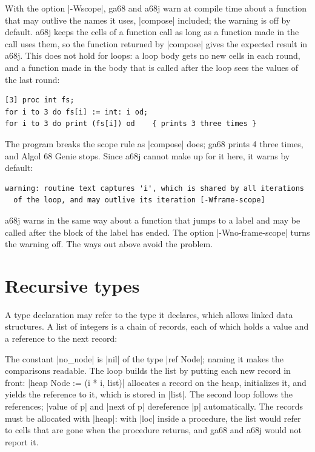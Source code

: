 \begin{implnote}
With the option \code|-Wscope|, ga68 and a68j warn at compile time about
a function that may outlive the names it uses, \code|compose| included;
the warning is off by default. a68j keeps the cells of a function call
as long as a function made in the call uses them, so the function
returned by \code|compose| gives the expected result in a68j. This does not hold for
loops: a loop body gets no new cells in each round, and a function made
in the body that is called after the loop sees the values of the last
round:
\begin{lstlisting}
[3] proc int fs;
for i to 3 do fs[i] := int: i od;
for i to 3 do print (fs[i]) od    { prints 3 three times }
\end{lstlisting}
The program breaks the scope rule as \code|compose| does; ga68 prints 4
three times, and Algol 68 Genie stops. Since a68j cannot make up for it
here, it warns by default:
\begin{lstlisting}[style=output]
warning: routine text captures 'i', which is shared by all iterations
  of the loop, and may outlive its iteration [-Wframe-scope]
\end{lstlisting}
\noindent a68j warns in the same way about a function that jumps to a
label and may be called after the block of the label has ended. The
option \code|-Wno-frame-scope| turns the warning off. The ways out above
avoid the problem.
\end{implnote}

\section{Recursive types}\label{sec-recursive}

A type declaration may refer to the type it declares, which allows
linked data structures. A list of integers is a chain of records, each of
which holds a value and a reference to the next record:


The constant \code|no_node| is \code|nil| of the type \code|ref Node|;
naming it makes the comparisons readable. The loop builds the list by
putting each new record in front: \code|heap Node := (i * i, list)|
allocates a record on the heap, initializes it, and yields the reference
to it, which is stored in \code|list|. The second loop follows the
references; \code|value of p| and \code|next of p| dereference \code|p|
automatically. The records must be allocated with \code|heap|: with
\code|loc| inside a procedure, the list would refer to cells that are
gone when the procedure returns, and ga68 and a68j would not report it.

